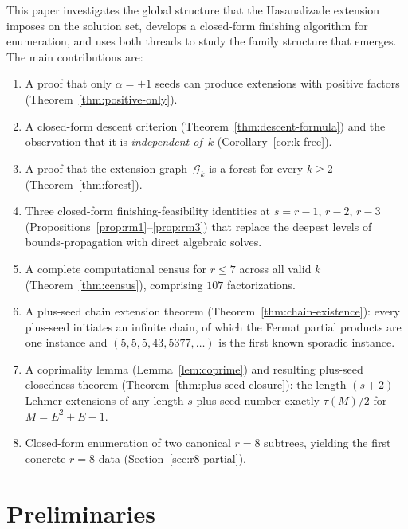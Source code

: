 \documentclass[11pt]{article}
\theoremstyle{definition}
\theoremstyle{remark}
\begin{document}
This paper investigates the global structure that the Hasanalizade
extension imposes on the solution set, develops a closed-form
finishing algorithm for enumeration, and uses both threads to study
the family structure that emerges.  The main contributions are:
\begin{enumerate}[label=(\roman*)]
  \item A proof that only $\alpha = +1$ seeds can produce extensions
    with positive factors (Theorem~\ref{thm:positive-only}).
  \item A closed-form descent criterion
    (Theorem~\ref{thm:descent-formula}) and the observation that it
    is \emph{independent of~$k$} (Corollary~\ref{cor:k-free}).
  \item A proof that the extension graph~$\mathcal{G}_k$ is a forest
    for every $k \ge 2$ (Theorem~\ref{thm:forest}).
  \item Three closed-form finishing-feasibility identities at
    $s = r - 1$, $r - 2$, $r - 3$
    (Propositions~\ref{prop:rm1}--\ref{prop:rm3}) that replace the
    deepest levels of bounds-propagation with direct algebraic solves.
  \item A complete computational census for $r \le 7$ across all
    valid $k$ (Theorem~\ref{thm:census}), comprising $107$
    factorizations.
  \item A plus-seed chain extension theorem
    (Theorem~\ref{thm:chain-existence}): every plus-seed initiates
    an infinite chain, of which the Fermat partial products are one
    instance and $(5, 5, 5, 43, 5377, \ldots)$ is the first known
    sporadic instance.
  \item A coprimality lemma
    (Lemma~\ref{lem:coprime}) and resulting plus-seed closedness
    theorem (Theorem~\ref{thm:plus-seed-closure}): the length-$(s+2)$
    Lehmer extensions of any length-$s$ plus-seed number exactly
    $\tau(M)/2$ for $M = E^2 + E - 1$.
  \item Closed-form enumeration of two canonical $r = 8$ subtrees,
    yielding the first concrete $r = 8$ data
    (Section~\ref{sec:r8-partial}).
\end{enumerate}


\section{Preliminaries}
\end{document}
